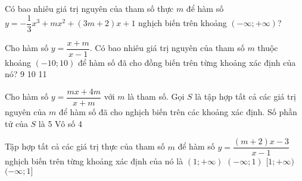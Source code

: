 \begin{ex}%
 Có bao nhiêu giá trị nguyên của tham số thực $m$ để hàm số $y = -\dfrac{1}{3}x^3 + mx^2 + (3m+2)x + 1$ nghịch biến trên khoảng $(-\infty;+\infty)$?
\end{ex}
\begin{ex}%
 Cho hàm số $y=\dfrac{x+m}{x-1}$. Có bao nhiêu giá trị nguyên của tham số $m$ thuộc khoảng $(-10;10)$ để hàm số đã cho đồng biến trên từng khoảng xác định của nó?
 \choice
 {}
 {9}
 {10}
 {11}
\end{ex}
\begin{ex}%
 Cho hàm số $y=\dfrac{mx+4m}{x+m}$ với $m$ là tham số. Gọi $S$ là tập hợp tất cả các giá trị nguyên của $m$ để hàm số đã cho nghịch biến trên các khoảng xác định. Số phần tử của $S$ là
 \choice
 {5}
 { Vô số}
 {4}
 {}
\end{ex}
\begin{ex}%
 Tập hợp tất cả các giá trị thực của tham số $m$ để hàm số $y=\dfrac{(m+2)x-3}{x-1}$ nghịch biến trên từng khoảng xác định của nó là
 \choice
 {\True $(1;+\infty)$}
 {$(-\infty;1)$}
 {$[1;+\infty)$}
 {$(-\infty;1]$}
\end{ex}
